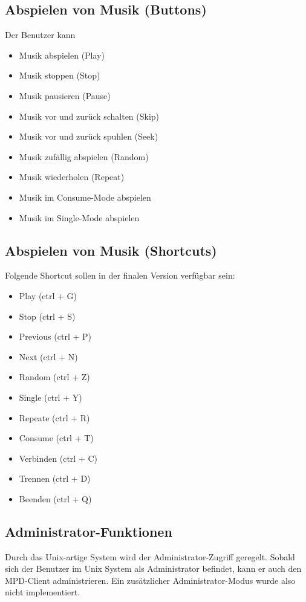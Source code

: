 \subsection{Abspielen von Musik (Buttons)}
Der Benutzer kann
\begin{itemize}
	\item Musik abspielen (Play)
	\item Musik stoppen (Stop)
	\item Musik pausieren (Pause)
	\item Musik vor und zurück schalten (Skip)
	\item Musik vor und zurück spuhlen (Seek)
	\item Musik zufällig abspielen (Random)
	\item Musik wiederholen (Repeat)
	\item Musik im Consume-Mode abspielen
	\item Musik im Single-Mode abspielen
\end{itemize}
\subsection{Abspielen von Musik (Shortcuts)}
Folgende Shortcut sollen in der finalen Version verfügbar sein:
\begin{itemize}
	\item Play 	(ctrl + G)
        \item Stop 	(ctrl + S)
        \item Previous 	(ctrl + P)
        \item Next	(ctrl + N)
	\item Random	(ctrl + Z)
	\item Single	(ctrl + Y)
	\item Repeate	(ctrl + R)
	\item Consume	(ctrl + T)
        \item Verbinden	(ctrl + C)
	\item Trennen	(ctrl + D)
	\item Beenden	(ctrl + Q)
\end{itemize}


\subsection{Administrator-Funktionen}
Durch das Unix-artige System wird der Administrator-Zugriff geregelt. Sobald sich der Benutzer im Unix System
als Administrator befindet, kann er auch den MPD-Client administrieren. Ein zusätzlicher Administrator-Modus wurde also
nicht implementiert.

